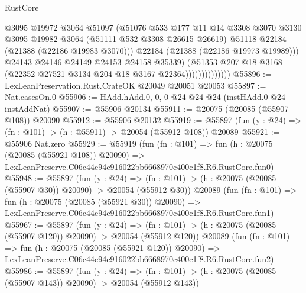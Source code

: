 \begin{lexlean}{RustCore}
\begin{coremodule}
                                @3095
                                @19972
                                @3064
                                @51097
                                (@51076
                                  @533
                                  @177
                                  @11
                                  @14
                                  @3308
                                  @3070
                                  @3130
                                  @3095
                                  @19982
                                  @3064
                                  (@51111 @532 @3308 @26615 @26619)
                                  @51118
                                  @22184
                                  (@21388 (@22186 @19983 @3070)))
                                @22184
                                (@21388 (@22186 @19973 @19989)))
                              @24143
                              @24146
                              @24149
                              @24153
                              @24158
                              @35339)
                            (@51353
                              @207
                              @18
                              @3168
                              (@22352 @27521 @3134 @204 @18 @3167 @22364))))))))))))))
@55896 := LexLeanPreservation.Rust.CrateOK @20049 @20051 @20053
@55897 := Nat.casesOn.{0}
@55906 := HAdd.hAdd.{0, 0, 0} @24 @24 @24 (instHAdd.{0} @24 instAddNat)
@55907 := @55906 @20134
@55911 := @20075 (@20085 (@55907 @108)) @20090
@55912 := @55906 @20132
@55919 := @55897 (fun (y : @24) => (fn : @101) -> (h : @55911) -> @20054 (@55912 @108)) @20089
@55921 := @55906 Nat.zero
@55929 := @55919
    (fun (fn : @101) =>
    fun (h : @20075 (@20085 (@55921 @108)) @20090) =>
    LexLeanPreserve.C06c44e94c916022bb6668970c400c1f8.R6.RustCore.fun0)
@55948 := @55897
    (fun (y : @24) =>
    (fn : @101) -> (h : @20075 (@20085 (@55907 @30)) @20090) -> @20054 (@55912 @30))
    @20089
    (fun (fn : @101) =>
    fun (h : @20075 (@20085 (@55921 @30)) @20090) =>
    LexLeanPreserve.C06c44e94c916022bb6668970c400c1f8.R6.RustCore.fun1)
@55967 := @55897
    (fun (y : @24) =>
    (fn : @101) -> (h : @20075 (@20085 (@55907 @120)) @20090) -> @20054 (@55912 @120))
    @20089
    (fun (fn : @101) =>
    fun (h : @20075 (@20085 (@55921 @120)) @20090) =>
    LexLeanPreserve.C06c44e94c916022bb6668970c400c1f8.R6.RustCore.fun2)
@55986 := @55897
    (fun (y : @24) =>
    (fn : @101) -> (h : @20075 (@20085 (@55907 @143)) @20090) -> @20054 (@55912 @143))

\end{coremodule}
\end{lexlean}
